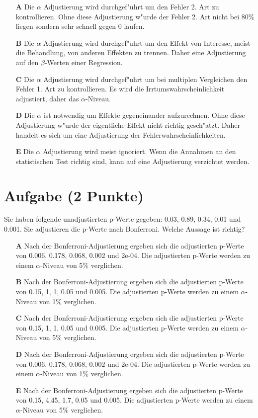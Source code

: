 \documentclass[a4paper, 10pt]{scrartcl}\usepackage[]{graphicx}\usepackage[]{xcolor}
\begin{document}
\begin{enumerate}
\item [\textbf{A} \msquare] Die $\alpha$ Adjustierung wird durchgef{"u}hrt um den Fehler 2. Art zu kontrollieren. Ohne diese Adjustierung w{"u}rde der Fehler 2. Art nicht bei 80\% liegen sondern sehr schnell gegen 0 laufen.
\item [\textbf{B} \msquare] Die $\alpha$ Adjustierung wird durchgef{"u}hrt um den Effekt von Interesse, meist die Behandlung, von anderen Effekten zu trennen. Daher eine Adjustierung auf den $\beta$-Werten einer Regression.
\item [\textbf{C} \msquare] Die $\alpha$ Adjustierung wird durchgef{"u}hrt um bei multiplen Vergleichen den Fehler 1. Art zu kontrollieren. Es wird die Irrtumswahrscheinlichkeit adjustiert, daher das $\alpha$-Niveau.
\item [\textbf{D} \msquare] Die $\alpha$ ist notwendig um Effekte gegeneinander aufzurechnen. Ohne diese Adjustierung w{"u}rde der eigentliche Effekt nicht richtig gesch{"a}tzt. Daher handelt es sich um eine Adjustierung der Fehlerwahrscheinlichkeiten.
\item [\textbf{E} \msquare] Die $\alpha$ Adjustierung wird meist ignoriert. Wenn die Annahmen an den statistischen Test richtig sind, kann auf eine Adjustierung verzichtet werden.
\end{enumerate} 

\section{Aufgabe \hfill (2 Punkte)}



Sie haben folgende unadjustierten p-Werte gegeben: 0.03, 0.89, 0.34, 0.01 und 0.001. Sie adjustieren die p-Werte nach
Bonferroni. Welche Aussage ist richtig?



\begin{enumerate}
\item [\textbf{A} \msquare] Nach der Bonferroni-Adjustierung ergeben sich die adjustierten p-Werte von 0.006, 0.178, 0.068, 0.002 und 2e-04. Die adjustierten p-Werte werden zu einem $\alpha$-Niveau von 5\% verglichen.
\item [\textbf{B} \msquare] Nach der Bonferroni-Adjustierung ergeben sich die adjustierten p-Werte von 0.15, 1, 1, 0.05 und 0.005. Die adjustierten p-Werte werden zu einem $\alpha$-Niveau von 1\% verglichen.
\item [\textbf{C} \msquare] Nach der Bonferroni-Adjustierung ergeben sich die adjustierten p-Werte von 0.15, 1, 1, 0.05 und 0.005. Die adjustierten p-Werte werden zu einem $\alpha$-Niveau von 5\% verglichen.
\item [\textbf{D} \msquare] Nach der Bonferroni-Adjustierung ergeben sich die adjustierten p-Werte von 0.006, 0.178, 0.068, 0.002 und 2e-04. Die adjustierten p-Werte werden zu einem $\alpha$-Niveau von 1\% verglichen.
\item [\textbf{E} \msquare] Nach der Bonferroni-Adjustierung ergeben sich die adjustierten p-Werte von 0.15, 4.45, 1.7, 0.05 und 0.005. Die adjustierten p-Werte werden zu einem $\alpha$-Niveau von 5\% verglichen.
\end{enumerate} 
\end{document}
